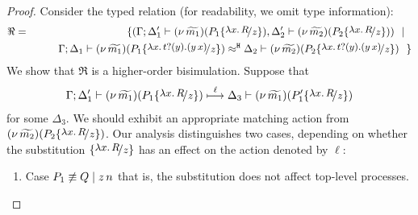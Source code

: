 \begin{proof}
	Consider the typed relation (for readability, we omit type information):
	\begin{eqnarray*}
		\Re	&=&	\set{
					(\Gamma; \Delta_1' \proves \newsp{\widetilde{m_1}}{P_1 \subst{{\abs{x}{R}}}{z}}, \Delta_2' \proves \newsp{\widetilde{m_2}}{P_2 \subst{{\abs{x}{R}}}{z}})
					\setbar\\
			&&		\qquad \horel{\Gamma}{\Delta_1}{\newsp{\widetilde{m_1}}{P_1 \subst{\trvalx{t}}{z} }}
					{\hwb}
					{\Delta_2}{\newsp{\widetilde{m_2}}{P_2 \subst{\trvalx{t}}{z} }}~~}
	\end{eqnarray*}
	We show that $\Re$ is a higher-order bisimulation. Suppose that 
	\begin{eqnarray}
		\horel{\Gamma}{\Delta_1'}{\newsp{\widetilde{m_1}}{P_1 \subst{{\abs{x}{R}}}{z} }}
		{\hby{\ell}}
		{\Delta_3}{\newsp{\widetilde{m_1}}{P_1' \subst{{\abs{x}{R}}}{z} }}
		\label{lem:proc_subst1}
	\end{eqnarray}
	for some $\Delta_3$.
   We should exhibit an appropriate matching action from $ \newsp{\widetilde{m_2}}{P_2 \subst{{\abs{x}{R}}}{z}}$.
	Our analysis distinguishes two cases, depending on whether the
	substitution $\subst{{\abs{x}{R}}}{z}$ has an effect on the action denoted by $\ell$:
	\begin{enumerate}
		\item	Case $P_1 \not\equiv Q \;|\; z\, {n}$ that is,
				the substitution does not affect top-level processes. 


\end{enumerate}
\end{proof}
